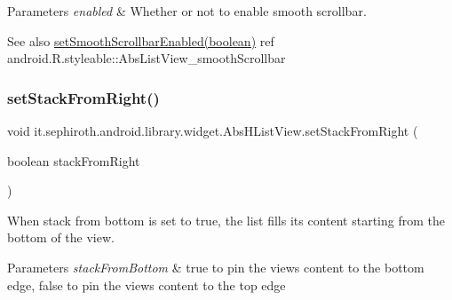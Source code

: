 \begin{DoxyParams}{Parameters}
{\em enabled} & Whether or not to enable smooth scrollbar.\\
\hline
\end{DoxyParams}
\begin{DoxySeeAlso}{See also}
\hyperlink{classit_1_1sephiroth_1_1android_1_1library_1_1widget_1_1_abs_h_list_view_a926b68b154bc94af5b3329aceff1d0fc}{set\+Smooth\+Scrollbar\+Enabled(boolean)}  ref android.\+R.\+styleable\+::\+Abs\+List\+View\+\_\+smooth\+Scrollbar 
\end{DoxySeeAlso}
\mbox{\label{classit_1_1sephiroth_1_1android_1_1library_1_1widget_1_1_abs_h_list_view_ac486e4a6157200a6ad86336441d84dce}} 
\subsubsection{\texorpdfstring{set\+Stack\+From\+Right()}{setStackFromRight()}}
{\footnotesize\ttfamily void it.\+sephiroth.\+android.\+library.\+widget.\+Abs\+H\+List\+View.\+set\+Stack\+From\+Right (\begin{DoxyParamCaption}\item[{boolean}]{stack\+From\+Right }\end{DoxyParamCaption})}

When stack from bottom is set to true, the list fills its content starting from the bottom of the view.


\begin{DoxyParams}{Parameters}
{\em stack\+From\+Bottom} & true to pin the view\textquotesingle{}s content to the bottom edge, false to pin the view\textquotesingle{}s content to the top edge \\
\hline
\end{DoxyParams}
\mbox{\label{classit_1_1sephiroth_1_1android_1_1library_1_1widget_1_1_abs_h_list_view_a8b67a85811d964b7e821ac0f18894381}} 
